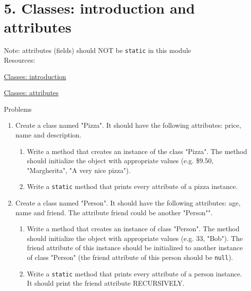 \documentclass[12pt,letterpaper]{article}
\newcommand\hwnumber{5}
\begin{document}
\section*{\hwnumber. Classes: introduction and attributes}
Note: attributes (fields) should NOT be \lstinline{static} in this module \\
Resources:
\begin{description}
    \item \href{https://www.w3schools.com/java/java_classes.asp}{Classes: introduction}
    \item \href{https://www.w3schools.com/java/java_classes.asp}{Classes: attributes}
\end{description}


Problems
\begin{enumerate}
\item
Create a class named "Pizza". It should have the following attributes: price, name and description. 
\begin{enumerate}
\item 
Write a method
that creates an instance of the class "Pizza". The method should initialize the object with appropriate values (e.g. \$9.50, "Margherita", "A very nice pizza").
\item
Write a \lstinline[]$static$ method that prints every attribute of a pizza instance.
\end{enumerate}

\item
Create a class named "Person". It should have the following attributes: age, name and friend. The attribute friend
could be another "Person"".

\begin{enumerate}
\item 
Write a method that creates an instance of class "Person".
The method should initialize the object with appropriate values (e.g. 33, "Bob").
The friend attribute of this instance should be initialized to another instance of class "Person" 
(the friend attribute of this person should be \lstinline[]$null$).
\item
Write a \lstinline[]$static$ method that prints every attribute of a person instance. It should print the friend attribute
RECURSIVELY.
\end{enumerate}


\end{enumerate}
\end{document}
